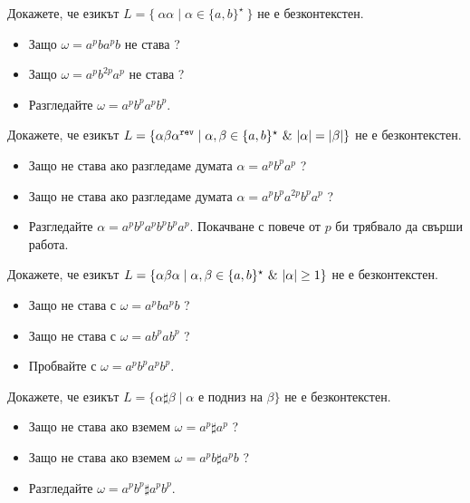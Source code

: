 \begin{extra}
\begin{problem}
  Докажете, че езикът $L = \{\ \alpha\alpha\mid \alpha\in \{a,b\}^\star\ \}$ не е безконтекстен.
\end{problem}
\begin{hint}
  \begin{itemize}
  \item 
    Защо $\omega = a^pba^pb$ не става ?
  \item
    Защо $\omega = a^pb^{2p}a^p$ не става ?
  \item
    Разгледайте $\omega = a^pb^pa^pb^p$.
  \end{itemize}
\end{hint}


\begin{problem}
  Докажете, че езикът $L = \{\alpha\beta\alpha^{\rev} \mid \alpha,\beta \in \{a,b\}^\star\ \&\ |\alpha| = |\beta|\}$ не е безконтекстен.
\end{problem}
\begin{hint}
  \begin{itemize}
  \item
    Защо не става ако разгледаме думата $\alpha = a^pb^pa^p$ ?
  \item 
    Защо не става ако разгледаме думата $\alpha = a^p b^p a^{2p} b^p a^p$ ?
  \item
    Разгледайте $\alpha = a^p b^p a^p b^p b^p a^p$.
    Покачване с повече от $p$ би трябвало да свърши работа.
  \end{itemize}
\end{hint}

\begin{problem}
  Докажете, че езикът $L = \{\alpha\beta\alpha \mid \alpha,\beta \in \{a,b\}^\star\ \&\ \abs{\alpha} \geq 1\}$ не е безконтекстен.
\end{problem}
\begin{hint}
  \begin{itemize}
  \item 
    Защо не става с $\omega = a^pba^pb$ ?
  \item
    Защо не става с $\omega = ab^pab^p$ ?
  \item
    Пробвайте с $\omega = a^pb^pa^pb^p$.
  \end{itemize}
\end{hint}

\begin{problem}
  Докажете, че езикът $L = \{\alpha\sharp\beta \mid \alpha\text{ е подниз на }\beta\}$ не е безконтекстен.
\end{problem}
\begin{hint}
  \begin{itemize}
  \item 
    Защо не става ако вземем $\omega = a^p \sharp a^p$ ?
  \item 
    Защо не става ако вземем $\omega = a^pb \sharp a^pb$ ?
  \item
    Разгледайте $\omega = a^pb^p\sharp a^pb^p$.
  \end{itemize}
\end{hint}



\end{extra}
